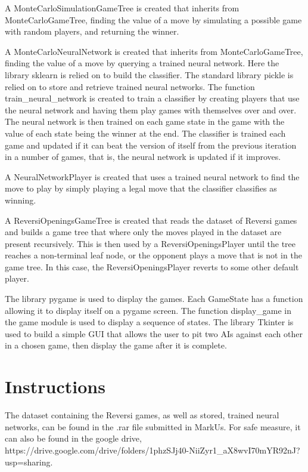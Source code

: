 \documentclass[fontsize=11pt]{article}
\begin{document}
A MonteCarloSimulationGameTree is created that inherits from MonteCarloGameTree, finding the value of a move by simulating a possible game 
with random players, and returning the winner.

A MonteCarloNeuralNetwork is created that inherits from MonteCarloGameTree, finding the value of a move by querying a trained neural network.
Here the library sklearn is relied on to build the classifier. The standard library pickle is relied on to store and retrieve trained neural networks.
The function train\_neural\_network is created to train a classifier by creating players that use the neural network and having them play games with themselves 
over and over. The neural network is then trained on each game state in the game with the value of each state being the winner at the end.
The classifier is trained each game and updated if it can beat the version of itself from the previous iteration in a number of games,
that is, the neural network is updated if it improves.

A NeuralNetworkPlayer is created that uses a trained neural network to find the move to play by simply playing a legal move that 
the classifier classifies as winning.

A ReversiOpeningsGameTree is created that reads the dataset of Reversi games and builds a game tree that where only the moves played in the 
dataset are present recursively. This is then used by a ReversiOpeningsPlayer until the tree reaches a non-terminal leaf node, 
or the opponent plays a move that is not in the game tree. In this case, the ReversiOpeningsPlayer reverts to some other default player.

The library pygame is used to display the games. Each GameState has a function allowing it to display itself on a pygame screen.
The function display\_game in the game module is used to display a sequence of states. The library Tkinter is used to build a simple GUI
that allows the user to pit two AIs against each other in a chosen game, then display the game after it is complete.

\section*{Instructions}

The dataset containing the Reversi games, as well as stored, trained neural networks, can be found in 
the .rar file submitted in MarkUs. For safe measure, it can also be found in the google drive, 
https://drive.google.com/drive/folders/1phzSJj40-NiiZyr1\_aX8wvI70mYR92nJ?usp=sharing.
\end{document}
